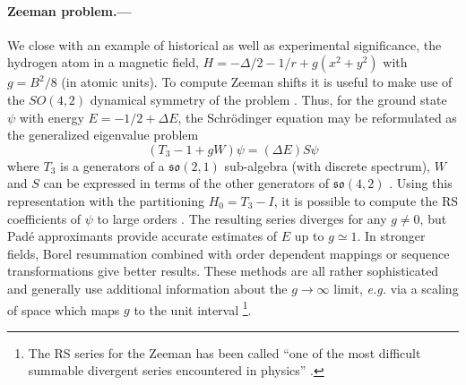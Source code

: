 \documentclass[aps,prl,reprint]{revtex4-2}
\begin{document}





	\paragraph{Zeeman problem.---} We close with an example of historical as well as experimental significance, the hydrogen atom in a magnetic field, $H = -\Delta/2 -1/r + g(x^2+y^2)$ with $g=B^2/8$ (in atomic units). To compute Zeeman shifts it is useful to make use of the $SO(4,2)$ dynamical symmetry of the problem \cite{cizekAlgebraicApproachBound1977, adamsAlgebraicApproachSimple1994}. Thus, for the ground state $\psi$ with energy $E=-1/2 +\Delta E$, the Schr\"odinger equation may be reformulated as the generalized eigenvalue problem
	\begin{equation}\label{zeeman}
	    (T_3-1+g W)\psi = (\Delta  E)S\psi
	\end{equation}
	where $T_3$ is a generators of a $\mathfrak{so}(2,1)$ sub-algebra (with discrete spectrum), $W$ and $S$ can be expressed in terms of the other generators of $\mathfrak{so}(4,2)$ \cite[Chap. 9]{adamsAlgebraicApproachSimple1994}. Using this representation with the partitioning $H_0  = T_3-I$, it is possible to compute the RS coefficients of $\psi$ to large orders \cite{cizekLargeOrderPerturbation1982}. The resulting series diverges for any $g\neq 0$, but Padé approximants provide accurate estimates of $E$ up to $g\simeq 1$. In stronger fields, Borel resummation combined with order dependent mappings \cite{leguillouHydrogenAtomStrong1990} or sequence transformations \cite{cizekNewSummationTechnique2003} give better results. These methods are all rather sophisticated and generally use additional information about the $g\to \infty$ limit, \emph{e.g.} via a scaling of space which maps $g$ to the unit interval \footnote{The RS series for the Zeeman has been called ``one of the most difficult summable divergent series encountered in physics'' \cite{cizekNewSummationTechnique2003}.}.
\end{document}
